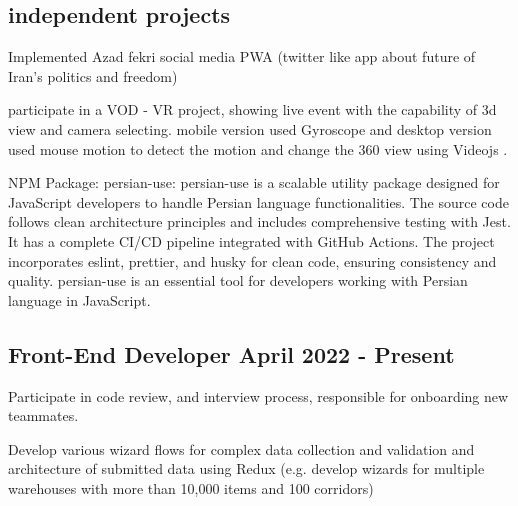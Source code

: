 \subsection{{independent projects }}

\begin{zitemize}

             \item{
                Implemented Azad fekri social media PWA (twitter like app about future of Iran's politics and freedom)}
             \item{
                participate in a VOD - VR project, showing live event with the capability of 3d view and camera selecting. mobile version used Gyroscope and desktop version used mouse motion to detect the motion and change the 360 view using Videojs .
                }

                             \item{
               NPM Package: persian-use: persian-use is a scalable utility package designed for JavaScript developers to handle Persian language functionalities. The source code follows clean architecture principles and includes comprehensive testing with Jest. It has a complete CI/CD pipeline integrated with GitHub Actions. The project incorporates eslint, prettier, and husky for clean code, ensuring consistency and quality. persian-use is an essential tool for developers working with Persian language in JavaScript.
                }


\end{zitemize}
\subsection{{Front-End Developer \hfill April 2022 - Present}}
\begin{zitemize}
             \item{
                Participate in code review, and interview process, responsible for onboarding new teammates.}
             \item{
                Develop various wizard flows for complex data collection and validation and architecture of submitted data using Redux (e.g. develop wizards for multiple warehouses with more than 10,000 items and 100 corridors)}


\end{zitemize}

